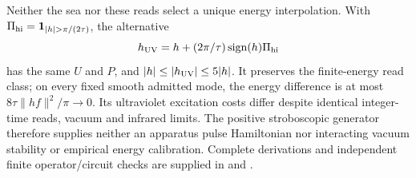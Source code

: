 Neither the sea nor these reads select a unique energy interpolation.
With $\Pi_{\rm hi}=\mathbf1_{|h|>\pi/(2\tau)}$, the alternative
\[
 h_{\rm UV}=h+(2\pi/\tau)\operatorname{sign}(h)\Pi_{\rm hi}
\]
has the same $U$ and $P$, and $|h|\le|h_{\rm UV}|\le5|h|$.
It preserves the finite-energy read class; on every fixed smooth admitted
mode, the energy difference is at most $8\tau\|hf\|^2/\pi\to0$.
Its ultraviolet excitation costs differ despite identical integer-time
reads, vacuum and infrared limits. The positive stroboscopic generator
therefore supplies neither an apparatus pulse Hamiltonian nor interacting
vacuum stability or empirical energy calibration. Complete derivations and
independent finite operator/circuit checks are supplied in
 and .
